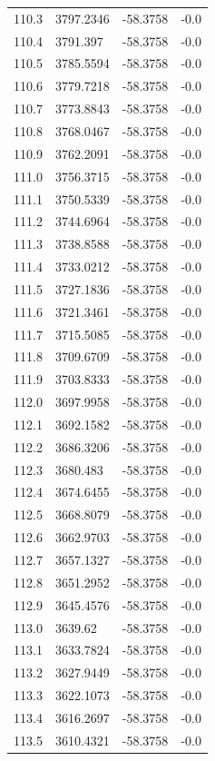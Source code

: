 \begin{table}[H]
\begin{tabular}{llll}
110.3 & 3797.2346 & -58.3758 & -0.0 \\
110.4 & 3791.397 & -58.3758 & -0.0 \\
110.5 & 3785.5594 & -58.3758 & -0.0 \\
110.6 & 3779.7218 & -58.3758 & -0.0 \\
110.7 & 3773.8843 & -58.3758 & -0.0 \\
110.8 & 3768.0467 & -58.3758 & -0.0 \\
110.9 & 3762.2091 & -58.3758 & -0.0 \\
111.0 & 3756.3715 & -58.3758 & -0.0 \\
111.1 & 3750.5339 & -58.3758 & -0.0 \\
111.2 & 3744.6964 & -58.3758 & -0.0 \\
111.3 & 3738.8588 & -58.3758 & -0.0 \\
111.4 & 3733.0212 & -58.3758 & -0.0 \\
111.5 & 3727.1836 & -58.3758 & -0.0 \\
111.6 & 3721.3461 & -58.3758 & -0.0 \\
111.7 & 3715.5085 & -58.3758 & -0.0 \\
111.8 & 3709.6709 & -58.3758 & -0.0 \\
111.9 & 3703.8333 & -58.3758 & -0.0 \\
112.0 & 3697.9958 & -58.3758 & -0.0 \\
112.1 & 3692.1582 & -58.3758 & -0.0 \\
112.2 & 3686.3206 & -58.3758 & -0.0 \\
112.3 & 3680.483 & -58.3758 & -0.0 \\
112.4 & 3674.6455 & -58.3758 & -0.0 \\
112.5 & 3668.8079 & -58.3758 & -0.0 \\
112.6 & 3662.9703 & -58.3758 & -0.0 \\
112.7 & 3657.1327 & -58.3758 & -0.0 \\
112.8 & 3651.2952 & -58.3758 & -0.0 \\
112.9 & 3645.4576 & -58.3758 & -0.0 \\
113.0 & 3639.62 & -58.3758 & -0.0 \\
113.1 & 3633.7824 & -58.3758 & -0.0 \\
113.2 & 3627.9449 & -58.3758 & -0.0 \\
113.3 & 3622.1073 & -58.3758 & -0.0 \\
113.4 & 3616.2697 & -58.3758 & -0.0 \\
113.5 & 3610.4321 & -58.3758 & -0.0 \\

\end{tabular}
\end{table}
